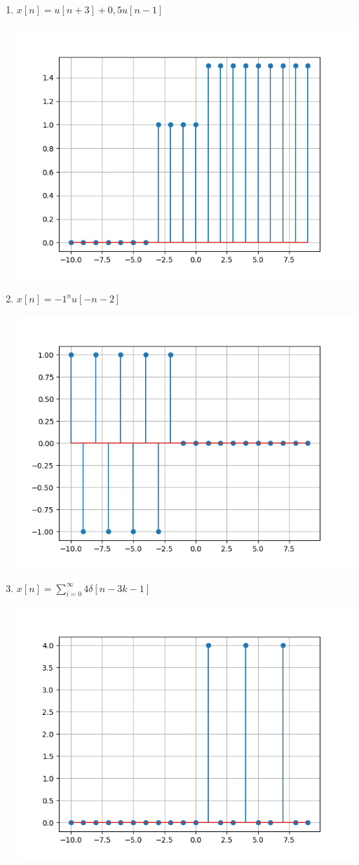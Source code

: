 \documentclass[11pt]{article}
\begin{document}
\begin{question}
\begin{enumerate}
\item{$x[n] = u[n+3] + 0,5u[n-1]$}
  \begin{center}
    \includegraphics[width=0.5\columnwidth]{graph0.png} %
  \end{center}
\item{$x[n] = -1^{n} u[-n-2]$}
  \begin{center}
    \includegraphics[width=0.5\columnwidth]{graph1.png} %
  \end{center}
\item{$x[n] = \sum_{i=0}^{\infty} 4\delta[n-3k-1] $}
  \begin{center}
    \includegraphics[width=0.5\columnwidth]{graph2.png} %
  \end{center}
\end{enumerate}

\end{question}

\end{document}
